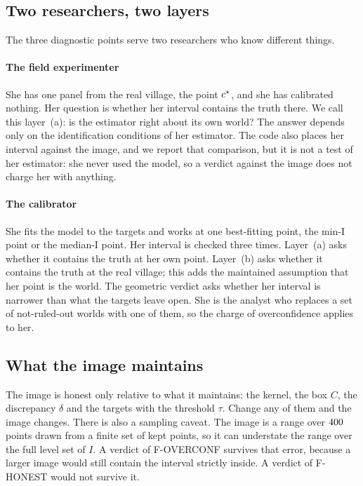 \subsection{Two researchers, two layers}\label{sec:twoanalysts}

The three diagnostic points serve two researchers who know different things.

\paragraph{The field experimenter} She has one panel from the real village, the
point $c^\star$, and she has calibrated nothing. Her question is whether her
interval contains the truth there. We call this layer~(a): is the estimator right
about its own world? The answer depends only on the identification conditions of
her estimator. The code also places her interval against the image, and we report
that comparison, but it is not a test of her estimator: she never used the model,
so a verdict against the image does not charge her with anything.

\paragraph{The calibrator} She fits the model to the targets and works at one
best-fitting point, the min-I point or the median-I point. Her interval is checked
three times. Layer~(a) asks whether it contains the truth at her own point. Layer~(b)
asks whether it contains the truth at the real village; this adds the maintained
assumption that her point is the world. The geometric verdict asks whether her
interval is narrower than what the targets leave open. She is the analyst who
replaces a set of not-ruled-out worlds with one of them, so the charge of
overconfidence applies to her.

\subsection{What the image maintains}

The image is honest only relative to what it maintains: the kernel, the box $C$,
the discrepancy $\delta$ and the targets with the threshold $\tau$. Change any of
them and the image changes. There is also a sampling caveat. The image is a range
over $400$ points drawn from a finite set of kept points, so it can
understate the range over the full level set of $I$. A verdict of F-OVERCONF
survives that error, because a larger image would still contain the interval
strictly inside. A verdict of F-HONEST would not survive it.


